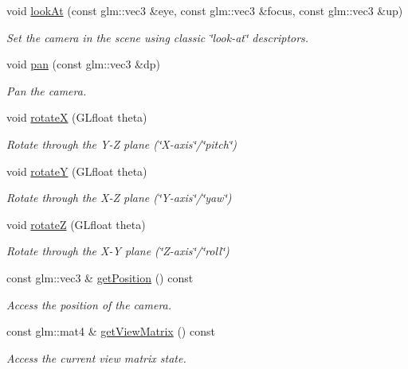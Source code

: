 \begin{DoxyCompactItemize}
void \hyperlink{class_camera_af04cfb4727b7b20e4728e0cdebf8e1c9}{look\+At} (const glm\+::vec3 \&eye, const glm\+::vec3 \&focus, const glm\+::vec3 \&up)
\begin{DoxyCompactList}\small\item\em Set the camera in the scene using classic \char`\"{}look-\/at\char`\"{} descriptors. \end{DoxyCompactList}\item 
void \hyperlink{class_camera_a84aef2b61721b9246414a89a09fac235}{pan} (const glm\+::vec3 \&dp)
\begin{DoxyCompactList}\small\item\em Pan the camera. \end{DoxyCompactList}\item 
void \hyperlink{class_camera_add2cd15792f3a290a56311334d736898}{rotateX} (G\+Lfloat theta)
\begin{DoxyCompactList}\small\item\em Rotate through the Y-\/Z plane (\char`\"{}\+X-\/axis\char`\"{}/\char`\"{}pitch\char`\"{}) \end{DoxyCompactList}\item 
void \hyperlink{class_camera_ae2354566eb8c0420537b3f61350a8c6f}{rotateY} (G\+Lfloat theta)
\begin{DoxyCompactList}\small\item\em Rotate through the X-\/Z plane (\char`\"{}\+Y-\/axis\char`\"{}/\char`\"{}yaw\char`\"{}) \end{DoxyCompactList}\item 
void \hyperlink{class_camera_a83b1b32ad7a7746a91ab855c160b6c19}{rotateZ} (G\+Lfloat theta)
\begin{DoxyCompactList}\small\item\em Rotate through the X-\/Y plane (\char`\"{}\+Z-\/axis\char`\"{}/\char`\"{}roll\char`\"{}) \end{DoxyCompactList}\item 
const glm\+::vec3 \& \hyperlink{class_camera_ac3f20f73b8e37f445da786bfe9e33690}{get\+Position} () const 
\begin{DoxyCompactList}\small\item\em Access the position of the camera. \end{DoxyCompactList}\item 
const glm\+::mat4 \& \hyperlink{class_camera_a8770289592db9df6f7ab08de42d6fa9c}{get\+View\+Matrix} () const 
\begin{DoxyCompactList}\small\item\em Access the current view matrix state. \end{DoxyCompactList}\item 

\end{DoxyCompactItemize}
